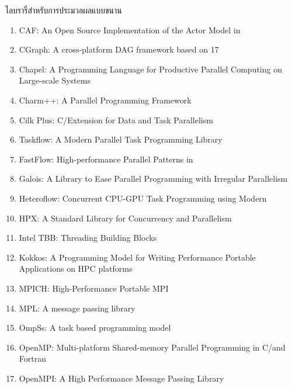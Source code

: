 ไลบรารี่สำหรับการประมวลผลแบบขนาน
%
\begin{enumerate}[topsep=0pt,noitemsep]
  \setlength\itemsep{0.5em}
  \item CAF: An Open Source Implementation of the Actor Model in \cpp

  \item CGraph: A cross-platform DAG framework based on {\cpp}17

  \item Chapel: A Programming Language for Productive Parallel Computing on Large-scale Systems

  \item Charm++: A Parallel Programming Framework

  \item Cilk Plus: C/\cpp Extension for Data and Task Parallelism

  \item Taskflow: A Modern \cpp Parallel Task Programming Library

  \item FastFlow: High-performance Parallel Patterns in \cpp

  \item Galois: A \cpp Library to Ease Parallel Programming with Irregular Parallelism

  \item Heteroflow: Concurrent CPU-GPU Task Programming using Modern \cpp

  \item HPX: A \cpp Standard Library for Concurrency and Parallelism

  \item Intel TBB: Threading Building Blocks

  \item Kokkos: A \cpp Programming Model for Writing Performance Portable Applications on HPC platforms

  \item MPICH: High-Performance Portable MPI

  \item MPL: A message passing library

  \item OmpSs: A task based programming model

  \item OpenMP: Multi-platform Shared-memory Parallel Programming in C/\cpp and Fortran

  \item OpenMPI: A High Performance Message Passing Library


\end{enumerate}

